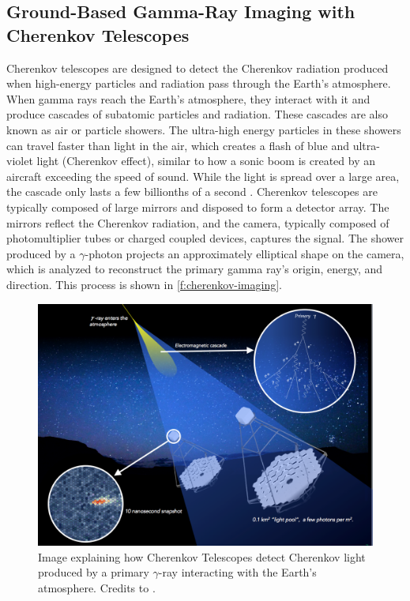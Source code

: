 \subsection{Ground-Based Gamma-Ray Imaging with Cherenkov Telescopes}
\label{ss:iact}
Cherenkov telescopes are designed to detect the Cherenkov radiation produced when high-energy particles and radiation pass through the Earth's atmosphere. 
When gamma rays reach the Earth's atmosphere, they interact with it and produce cascades of subatomic particles and radiation. These cascades are also known as air or particle showers. The ultra-high energy particles in these showers can travel faster than light in the air, which creates a flash of blue and ultra-violet light (Cherenkov effect), similar to how a sonic boom is created by an aircraft exceeding the speed of sound. While the light is spread over a large area, the cascade only lasts a few billionths of a second \cite{ong2009gamma}.  Cherenkov telescopes are typically composed of large mirrors and disposed to form a detector array. The mirrors reflect the Cherenkov radiation, and the camera, typically composed of photomultiplier tubes or charged coupled devices, captures the signal. The shower produced by a $\gamma$-photon projects an approximately elliptical shape on the camera, which is analyzed to reconstruct the primary gamma ray's origin, energy, and direction. This process is shown in \autoref{f:cherenkov-imaging}.
\begin{figure}[ht] 
\centering
\includegraphics[width=1\textwidth]{figures/introduction/cherenkov-imaging.png}
\caption{Image explaining how Cherenkov Telescopes detect Cherenkov light produced by a primary $\gamma$-ray interacting with the Earth’s atmosphere. Credits to \cite{ctaobservatorywebsite}.}
\label{f:cherenkov-imaging}
\end{figure}
